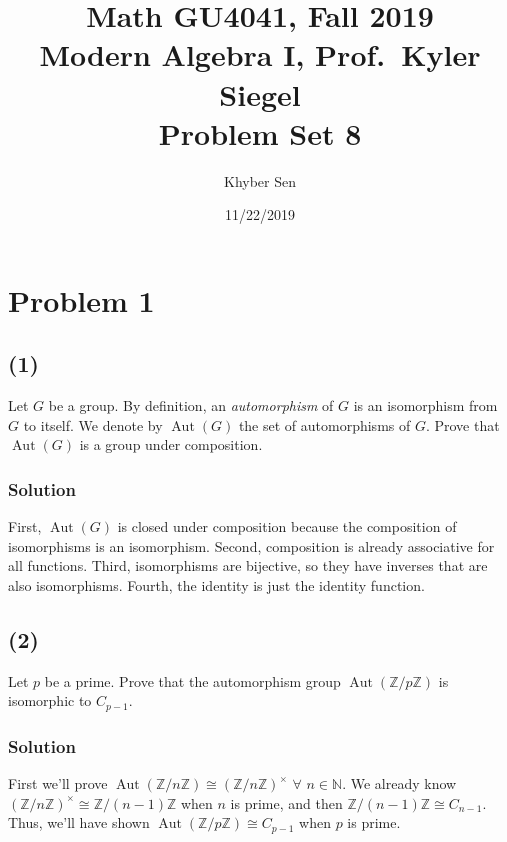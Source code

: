 \documentclass[fleqn]{article}
\title{
Math GU4041, Fall 2019 \\
Modern Algebra I, Prof.\ Kyler Siegel \\
Problem Set 8
}
\author{Khyber Sen}
\date{11/22/2019}
\DeclareMathOperator{\Aut}{Aut}
\begin{document}
    
    \maketitle
    
    \section{Problem 1}
        
        \subsection{(1)}
        Let $G$ be a group.  By definition, an \textit{automorphism} of $G$ is an isomorphism from $G$ to itself.  We denote by $\Aut(G)$ the set of automorphisms of $G$.  Prove that $\Aut(G)$ is a group under composition.
            
            \subsubsection{Solution}
            First, $\Aut(G)$ is closed under composition because the composition of isomorphisms is an isomorphism.  Second, composition is already associative for all functions.  Third, isomorphisms are bijective, so they have inverses that are also isomorphisms.  Fourth, the identity is just the identity function.
            
        \subsection{(2)}
        Let $p$ be a prime.  Prove that the automorphism group $\Aut(\mathbb{Z}/p\mathbb{Z})$ is isomorphic to $C_{p - 1}$.
            
            \subsubsection{Solution}
            First we'll prove $\Aut(\mathbb{Z}/n\mathbb{Z}) \cong (\mathbb{Z}/n\mathbb{Z})^\times$ $\forall$ $n \in \mathbb{N}$.  We already know $(\mathbb{Z}/n\mathbb{Z})^\times \cong \mathbb{Z}/(n - 1)\mathbb{Z}$ when $n$ is prime, and then $\mathbb{Z}/(n - 1)\mathbb{Z} \cong C_{n - 1}$.  Thus, we'll have shown $\Aut(\mathbb{Z}/p\mathbb{Z}) \cong C_{p - 1}$ when $p$ is prime.
            
\end{document}
